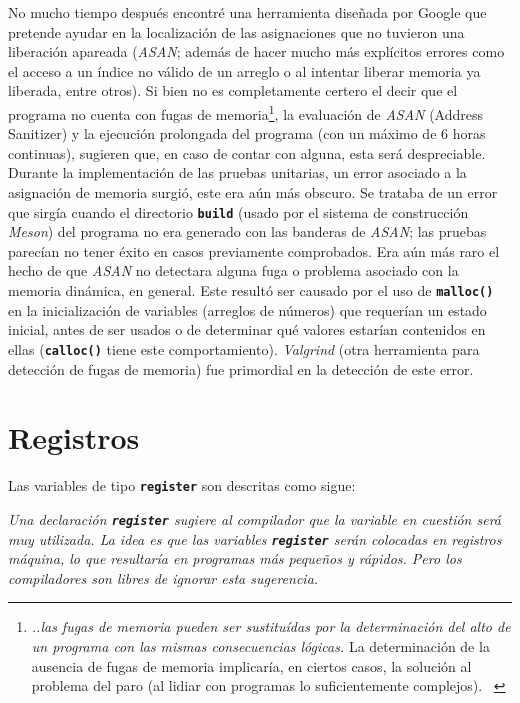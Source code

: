\documentclass[a4paper]{report}
\begin{document}
No mucho tiempo despu\'es encontr\'e una herramienta dise\~nada por Google que pretende ayudar en la localizaci\'on
de las asignaciones que no tuvieron una liberaci\'on apareada (\textit{ASAN}; adem\'as de hacer mucho m\'as
expl\'icitos errores como el acceso a un \'indice no v\'alido de un arreglo o al intentar liberar memoria ya
liberada, entre otros).
Si bien no es completamente certero el decir que el programa no cuenta con fugas de memoria\footnote{\textit{..las
    fugas de memoria pueden ser sustitu\'idas por la determinaci\'on del alto de un programa con las mismas
    consecuencias l\'ogicas.} La determinaci\'on de la ausencia de fugas de memoria implicar\'ia, en ciertos casos,
  la soluci\'on al problema del paro (al lidiar con programas lo suficientemente complejos). ~\cite{samsai}}, la
evaluaci\'on de \textit{ASAN} (Address Sanitizer) y la ejecuci\'on prolongada del programa (con un m\'aximo de 6
horas continuas), sugieren que, en caso de contar con alguna, esta ser\'a despreciable.\\

Durante la implementaci\'on de las pruebas unitarias, un error asociado a la asignaci\'on de memoria surgi\'o,
este era a\'un m\'as obscuro. Se trataba de un error que sirg\'ia cuando el directorio \textbf{\texttt{build}} (usado por
el sistema de construcci\'on \textit{Meson}) del programa no era generado con las banderas de \textit{ASAN};
las pruebas parec\'ian no tener \'exito en casos previamente comprobados. Era a\'un m\'as raro el hecho de que
\textit{ASAN} no detectara alguna fuga o problema asociado con la memoria din\'amica, en general. Este result\'o
ser causado por el uso de \textbf{\texttt{malloc()}} en la inicializaci\'on de variables (arreglos de n\'umeros)
que requer\'ian un estado inicial, antes de ser usados o de determinar qu\'e valores estar\'ian contenidos en
ellas (\textbf{\texttt{calloc()}} tiene este comportamiento). \textit{Valgrind} (otra herramienta para detecci\'on
de fugas de memoria) fue primordial en la detecci\'on de este error.\\

\section{Registros}
Las variables de tipo \textbf{\texttt{register}} son descritas como sigue:
\begin{center}
  \textit{Una declaraci\'on \texttt{\textbf{register}} sugiere al compilador que la variable en cuesti\'on
    ser\'a muy utilizada. La idea es que las variables \texttt{\textbf{register}} ser\'an colocadas en registros
    m\'aquina, lo que resultar\'ia en programas m\'as peque\~nos y r\'apidos. Pero los compiladores son libres
    de ignorar esta sugerencia.~\cite{cpl}}
\end{center}
\end{document}

